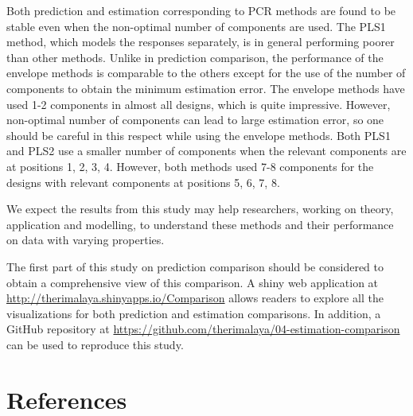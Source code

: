 \documentclass[12pt,3p,authoryear]{elsarticle}
\begin{document}
Both prediction and estimation corresponding to PCR methods are found to
be stable even when the non-optimal number of components are used. The
PLS1 method, which models the responses separately, is in general
performing poorer than other methods. Unlike in prediction comparison,
the performance of the envelope methods is comparable to the others
except for the use of the number of components to obtain the minimum
estimation error. The envelope methods have used 1-2 components in
almost all designs, which is quite impressive. However, non-optimal
number of components can lead to large estimation error, so one should
be careful in this respect while using the envelope methods. Both PLS1
and PLS2 use a smaller number of components when the relevant components
are at positions 1, 2, 3, 4. However, both methods used 7-8 components
for the designs with relevant components at positions 5, 6, 7, 8.

We expect the results from this study may help researchers, working on
theory, application and modelling, to understand these methods and their
performance on data with varying properties.

The first part of this study \citep{rimal2019pred} on prediction
comparison should be considered to obtain a comprehensive view of this
comparison. A shiny \citep{shiny} web application at
\url{http://therimalaya.shinyapps.io/Comparison} allows readers to
explore all the visualizations for both prediction and estimation
comparisons. In addition, a GitHub repository at
\url{https://github.com/therimalaya/04-estimation-comparison} can be
used to reproduce this study.

\section*{References}\label{references}

\hypertarget{refs}{}


\renewcommand\refname{References}

\end{document}
